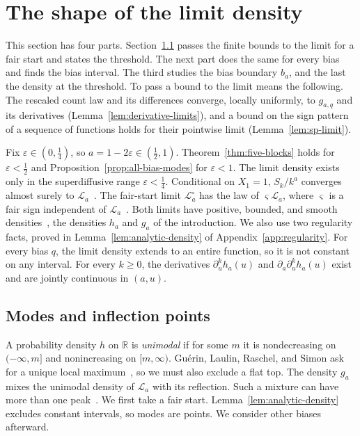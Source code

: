\section{The shape of the limit density}\label{sec:bulk-applications}

This section has four parts. Section~\ref{sec:modes} passes the finite
bounds to the limit for a fair start and states the threshold. The
next part does the same for every bias and finds the bias interval.
The third studies the bias boundary $b_a$, and the last the density at
the threshold. To pass a bound to the limit means the following. The
rescaled count law and its differences converge, locally uniformly, to
$g_{a,q}$ and its derivatives (Lemma~\ref{lem:derivative-limits}), and
a bound on the sign pattern of a sequence of functions holds for their
pointwise limit (Lemma~\ref{lem:sp-limit}).

Fix $\varepsilon\in(0,\frac14)$, so $a=1-2\varepsilon\in(\frac12,1)$.
Theorem~\ref{thm:five-blocks} holds for $\varepsilon<\frac12$ and
Proposition~\ref{prop:all-bias-modes} for $\varepsilon<1$. The limit
density exists only in the superdiffusive range $\varepsilon<\frac14$.
Conditional on $X_1=1$, $S_k/k^a$ converges almost surely to
$\mathcal L_a$~\cite[Theorem~3.7]{bercu2018}. The fair-start limit
$\mathcal L^\circ_a$ has the law of $\varsigma\mathcal L_a$, where $\varsigma$ is a fair sign independent of
$\mathcal L_a$~\cite[(1.3) and (1.6)]{glr2026}. Both limits have positive,
bounded, and smooth densities~\cite[Theorem~1.3]{glr2026}, the
densities $h_a$ and $g_a$ of the introduction.
We also use two regularity facts, proved in
Lemma~\ref{lem:analytic-density} of Appendix~\ref{app:regularity}. For
every bias $q$, the limit density extends to an entire function, so it
is not constant on any interval. For every $k\ge0$, the derivatives
$\partial_u^k h_a(u)$ and $\partial_a\partial_u^k h_a(u)$ exist and are
jointly continuous in $(a,u)$.

\subsection{Modes and inflection points}\label{sec:modes}

A probability density $h$ on $\mathbb R$ is \emph{unimodal} if for some $m$
it is nondecreasing on $(-\infty,m]$ and nonincreasing on $[m,\infty)$.
Gu\'erin, Laulin, Raschel, and Simon ask for a unique local maximum~\cite{glrs2025},
so we must also exclude a flat top. The density $g_a$ mixes the
unimodal density of $\mathcal L_a$ with its reflection. Such a
mixture can have more than one peak~\cite{dj1988}. We first take a fair start.
Lemma~\ref{lem:analytic-density} excludes constant intervals,
so modes are points. We consider other biases afterward.

